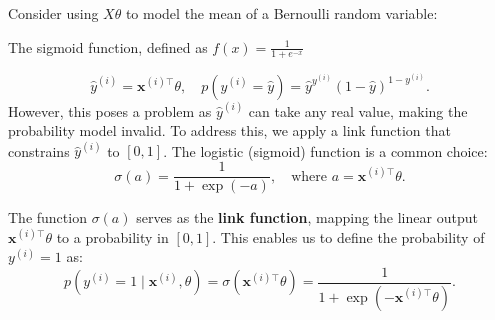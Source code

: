 Consider using \( X\theta \) to model the mean of a Bernoulli random variable:
\begin{marginfigure}
    \centering
    \caption{The sigmoid function, defined as \( f(x) = \frac{1}{1 + e^{-x}} \)}
    \label{fig:sigmoid}
\end{marginfigure}




\[
    \hat{y}^{(i)} = \boldsymbol{x}^{(i)\top}\theta, \quad p(y^{(i)} = \hat{y}) = \hat{y}^{y^{(i)}} (1 - \hat{y})^{1 - y^{(i)}}.
\]
However, this poses a problem as \( \hat{y}^{(i)} \) can take any real value, making the probability model invalid. To address this, we apply a link function that constrains \( \hat{y}^{(i)} \) to \([0,1]\). The logistic (sigmoid) function is a common choice:
\[
    \sigma(a) = \frac{1}{1 + \exp(-a)}, \quad \text{where } a = \boldsymbol{x}^{(i)\top}\theta.
\]




The function \( \sigma(a) \) serves as the \textbf{link function}, mapping the linear output \( \boldsymbol{x}^{(i)\top}\theta \) to a probability in \([0,1]\). This enables us to define the probability of \( y^{(i)} = 1 \) as:
\[
    p(y^{(i)} = 1 \mid \boldsymbol{x}^{(i)}, \theta) = \sigma(\boldsymbol{x}^{(i)\top}\theta) = \frac{1}{1 + \exp(-\boldsymbol{x}^{(i)\top}\theta)}.
\]

